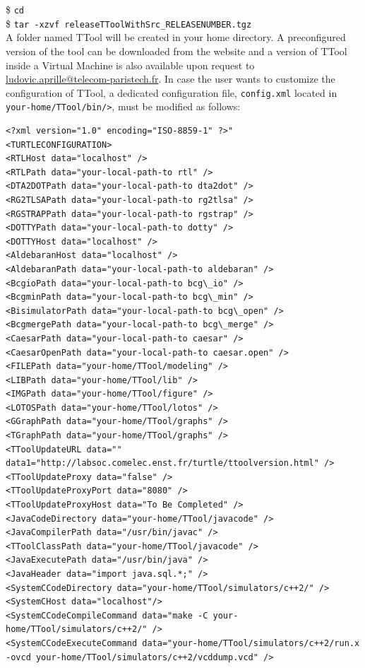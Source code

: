 \documentclass{llncs}
\begin{document}
\noindent
\$ \texttt{cd}\\
\$ \texttt{tar -xzvf releaseTToolWithSrc\_RELEASENUMBER.tgz}\\
%

\noindent A folder named TTool will be created in your home directory. A
preconfigured version of the tool can be downloaded from the website and a
version of TTool inside a Virtual Machine is also available upon request to
\href{mailto:ludovic.aprille@telecom-paristech.fr}{ludovic.aprille@telecom-paristech.fr}.
In case the user wants to customize the configuration of TTool, a dedicated
configuration file, \texttt{config.xml} located in
\texttt{your-home/TTool/bin/>}, must be modified as follows:\\
\begin{landscape}
\lstset{basicstyle=\tiny,language=XML}
\begin{lstlisting}
<?xml version="1.0" encoding="ISO-8859-1" ?>"
<TURTLECONFIGURATION>
<RTLHost data="localhost" />
<RTLPath data="your-local-path-to rtl" />
<DTA2DOTPath data="your-local-path-to dta2dot" />
<RG2TLSAPath data="your-local-path-to rg2tlsa" />
<RGSTRAPPath data="your-local-path-to rgstrap" />
<DOTTYPath data="your-local-path-to dotty" />
<DOTTYHost data="localhost" />
<AldebaranHost data="localhost" />
<AldebaranPath data="your-local-path-to aldebaran" />
<BcgioPath data="your-local-path-to bcg\_io" />
<BcgminPath data="your-local-path-to bcg\_min" />
<BisimulatorPath data="your-local-path-to bcg\_open" />
<BcgmergePath data="your-local-path-to bcg\_merge" />
<CaesarPath data="your-local-path-to caesar" />
<CaesarOpenPath data="your-local-path-to caesar.open" />
<FILEPath data="your-home/TTool/modeling" />
<LIBPath data="your-home/TTool/lib" />
<IMGPath data="your-home/TTool/figure" />
<LOTOSPath data="your-home/TTool/lotos" />
<GGraphPath data="your-home/TTool/graphs" />
<TGraphPath data="your-home/TTool/graphs" />
<TToolUpdateURL data="" data1="http://labsoc.comelec.enst.fr/turtle/ttoolversion.html" />
<TToolUpdateProxy data="false" />
<TToolUpdateProxyPort data="8080" />
<TToolUpdateProxyHost data="To Be Completed" />
<JavaCodeDirectory data="your-home/TTool/javacode" />
<JavaCompilerPath data="/usr/bin/javac" />
<TToolClassPath data="your-home/TTool/javacode" />
<JavaExecutePath data="/usr/bin/java" />
<JavaHeader data="import java.sql.*;" />
<SystemCCodeDirectory data="your-home/TTool/simulators/c++2/" />
<SystemCHost data="localhost"/>
<SystemCCodeCompileCommand data="make -C your-home/TTool/simulators/c++2/" />
<SystemCCodeExecuteCommand data="your-home/TTool/simulators/c++2/run.x -ovcd your-home/TTool/simulators/c++2/vcddump.vcd" />

\end{lstlisting}
\end{landscape}
\end{document}
